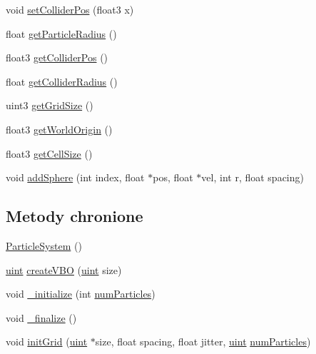 \begin{DoxyCompactItemize}
\item 
void \hyperlink{class_particle_system_a9c49794585cad649de400dc7375d7801}{set\-Collider\-Pos} (float3 x)
\item 
float \hyperlink{class_particle_system_abdb59a91d8483017ad71455bb2958993}{get\-Particle\-Radius} ()
\item 
float3 \hyperlink{class_particle_system_a3c8578d474f5a6f14d903a242aec96ec}{get\-Collider\-Pos} ()
\item 
float \hyperlink{class_particle_system_a56f07dfab9d5cbf510c6e0a28e816038}{get\-Collider\-Radius} ()
\item 
uint3 \hyperlink{class_particle_system_af94ba180bcb348afcfd81bb699d6aab0}{get\-Grid\-Size} ()
\item 
float3 \hyperlink{class_particle_system_a19d9bb799a5b5704d8fd6a286f6be20d}{get\-World\-Origin} ()
\item 
float3 \hyperlink{class_particle_system_a608bcb87f3d30fbfeae810da28ae1052}{get\-Cell\-Size} ()
\item 
void \hyperlink{class_particle_system_af2f16676fe8a0523cfb867a9a856970c}{add\-Sphere} (int index, float $\ast$pos, float $\ast$vel, int r, float spacing)
\end{DoxyCompactItemize}
\subsection*{Metody chronione}
\begin{DoxyCompactItemize}
\item 
\hyperlink{class_particle_system_a9028ec8023c61773dd4a668c3ad8cc26}{Particle\-System} ()
\item 
\hyperlink{particles__kernel_8cuh_a91ad9478d81a7aaf2593e8d9c3d06a14}{uint} \hyperlink{class_particle_system_a399eb5cb9c422fd3370899e4d8a5d62e}{create\-V\-B\-O} (\hyperlink{particles__kernel_8cuh_a91ad9478d81a7aaf2593e8d9c3d06a14}{uint} size)
\item 
void \hyperlink{class_particle_system_a484988642e046424d32a13709204e8de}{\-\_\-initialize} (int \hyperlink{particles_8cpp_a05b8a90212054a3eb1a036ae0c269596}{num\-Particles})
\item 
void \hyperlink{class_particle_system_a5d6a52db7d1277c8fe734ecceb69e5c6}{\-\_\-finalize} ()
\item 
void \hyperlink{class_particle_system_a2e08c4e354b0de5e2dc468a0fb457dfe}{init\-Grid} (\hyperlink{particles__kernel_8cuh_a91ad9478d81a7aaf2593e8d9c3d06a14}{uint} $\ast$size, float spacing, float jitter, \hyperlink{particles__kernel_8cuh_a91ad9478d81a7aaf2593e8d9c3d06a14}{uint} \hyperlink{particles_8cpp_a05b8a90212054a3eb1a036ae0c269596}{num\-Particles})
\end{DoxyCompactItemize}
